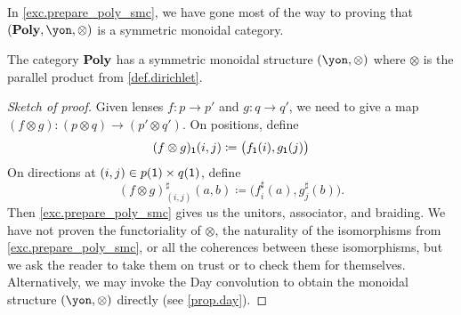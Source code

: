 \documentclass[Book-Poly]{subfiles}
\begin{document}
In \cref{exc.prepare_poly_smc}, we have gone most of the way to proving that $(\poly,\yon,\otimes)$ is a symmetric monoidal category. 

\begin{proposition}\label{prop.dirichlet_monoidal}
The category $\mathbf{Poly}$ has a symmetric monoidal structure $(\yon,\otimes)$ where $\otimes$ is the parallel product from \cref{def.dirichlet}.
\end{proposition}
\begin{proof}[Sketch of proof]
Given lenses $f\colon p\to p'$ and $g\colon q\to q'$, we need to give a map $(f\otimes g)\colon (p\otimes q)\to (p'\otimes q')$. On positions, define
\[
(f\otimes g)_{\textsf{1}}(i,j)\coloneqq \big(f_{\textsf{1}}(i),g_{\textsf{1}}(j)\big)
\]
On directions at $(i,j)\in p(\textsf{1})\times q(\textsf{1})$, define
\[
  (f\otimes g)^\sharp_{(i,j)}(a,b)\coloneqq
  \big(f^\sharp_i(a),g^\sharp_j(b)\big).
\]
Then \cref{exc.prepare_poly_smc} gives us the unitors, associator, and braiding.
We have not proven the functoriality of $\otimes$, the naturality of the isomorphisms from \cref{exc.prepare_poly_smc}, or all the coherences between these isomorphisms, but we ask the reader to take them on trust or to check them for themselves.
Alternatively, we may invoke the Day convolution to obtain the monoidal structure $(\yon, \otimes)$ directly (see \cref{prop.day}).
\end{proof}
\end{document}
